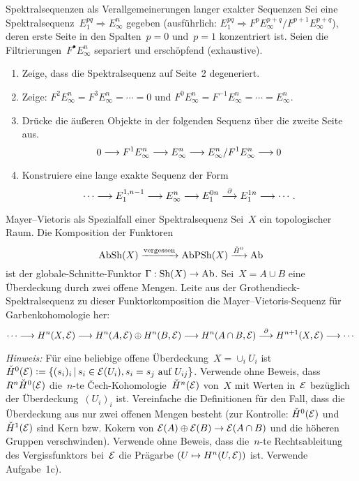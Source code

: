 \documentclass{uebblatt}
\begin{document}

\begin{aufgabe}{Spektralsequenzen als Verallgemeinerungen langer exakter Sequenzen}
Sei eine Spektralsequenz~$E_1^{pq} \Rightarrow E^n_\infty$ gegeben
(ausführlich: $E_1^{pq} \Rightarrow F^p
E^{p+q}_\infty/F^{p+1}E^{p+q}_\infty$), deren erste
Seite in den Spalten~$p = 0$ und~$p = 1$ konzentriert ist. Seien die
Filtrierungen~$F^\bullet E^n_\infty$ separiert und erschöpfend (exhaustive).
\begin{enumerate}
\item Zeige, dass die Spektralsequenz auf Seite~2 degeneriert.
\item Zeige: $F^2 E^n_\infty = F^3 E^n_\infty = \cdots = 0$ und
$F^0 E^n_\infty = F^{-1} E^n_\infty = \cdots = E^n_\infty$.
\item Drücke die äußeren Objekte in der folgenden Sequenz über
die zweite Seite aus.
\[ 0 \longrightarrow F^1 E^n_\infty \longrightarrow E^n_\infty \longrightarrow E^n_\infty/F^1 E^n_\infty \longrightarrow 0 \]
\vspace{-1.8em}
\item Konstruiere eine lange exakte Sequenz der Form
\[ \cdots \longrightarrow E^{1,n-1}_1 \longrightarrow E^n_\infty \longrightarrow E^{0n}_1
\stackrel{\partial}{\longrightarrow} E^{1n}_1 \longrightarrow \cdots. \]
\end{enumerate}
\vspace{-1em}
\end{aufgabe}

\begin{aufgabe}{Mayer--Vietoris als Spezialfall einer Spektralsequenz}
Sei~$X$ ein topologischer Raum. Die Komposition der Funktoren
\[ \mathrm{AbSh}(X) \xrightarrow{\text{vergessen}} \mathrm{AbPSh}(X)
  \xrightarrow{\check H^0} \mathrm{Ab} \]
ist der globale-Schnitte-Funktor $\Gamma : \mathrm{Sh}(X) \to \mathrm{Ab}$. Sei~$X = A \cup B$
eine Überdeckung durch zwei offene Mengen. Leite aus der
Grothendieck-Spektralsequenz zu dieser Funktorkomposition die
Mayer--Vietoris-Sequenz für Garbenkohomologie her:
\[ \cdots \longrightarrow H^n(X, \mathcal{E}) \longrightarrow
  H^n(A, \mathcal{E}) \oplus H^n(B, \mathcal{E}) \longrightarrow
  H^n(A \cap B, \mathcal{E}) \stackrel{\partial}{\longrightarrow} H^{n+1}(X, \mathcal{E}) \longrightarrow \cdots \]
{\tiny\emph{Hinweis:} Für eine beliebige offene Überdeckung~$X = \cup_i U_i$
ist~$\check H^0(\mathcal{E}) \vcentcolon= \{ (s_i)_i \,|\, s_i \in \mathcal{E}(U_i), \text{$s_i =
s_j$ auf $U_{ij}$} \}$. Verwende ohne Beweis, dass~$R^n \check H^0(\mathcal{E})$
die~$n$-te Čech-Kohomologie~$\check H^n(\mathcal{E})$ von~$X$ mit Werten in~$\mathcal{E}$ bezüglich der
Überdeckung~$(U_i)_i$ ist. Vereinfache die Definitionen für den Fall, dass die
Überdeckung aus nur zwei offenen Mengen besteht (zur Kontrolle: $\check
H^0(\mathcal{E})$ und~$\check H^1(\mathcal{E})$ sind Kern bzw. Kokern von $\mathcal{E}(A) \oplus \mathcal{E}(B) \to
\mathcal{E}(A \cap B)$ und die höheren Gruppen verschwinden). Verwende ohne Beweis, dass
die~$n$-te Rechtsableitung des Vergissfunktors bei~$\mathcal{E}$ die Prägarbe $(U
\mapsto H^n(U, \mathcal{E}))$ ist. Verwende Aufgabe~1c).\par}
\end{aufgabe}
\end{document}
